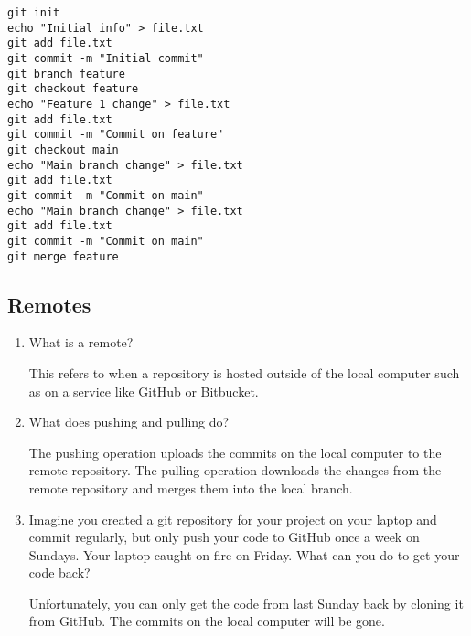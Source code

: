 \documentclass[10pt,twocolumn]{article}
\begin{document}
\begin{enumerate}
\texttt{git init}\\
\texttt{echo "Initial info" > file.txt}\\
\texttt{git add file.txt}\\
\texttt{git commit -m "Initial commit"}\\
\texttt{git branch feature}\\
\texttt{git checkout feature}\\
\texttt{echo "Feature 1 change" > file.txt}\\
\texttt{git add file.txt}\\
\texttt{git commit -m "Commit on feature"}\\
\texttt{git checkout main}\\
\texttt{echo "Main branch change" > file.txt}\\
\texttt{git add file.txt}\\
\texttt{git commit -m "Commit on main"}\\
\texttt{echo "Main branch change" > file.txt}\\
\texttt{git add file.txt}\\
\texttt{git commit -m "Commit on main"}\\
\texttt{git merge feature}\\
\end{enumerate}

\subsection{Remotes}

\begin{enumerate}
\item What is a remote?

This refers to when a repository is hosted outside of the local computer such as on a service like GitHub or Bitbucket. 
\item What does pushing and pulling do?

The pushing operation uploads the commits on the local computer to the remote repository. The pulling operation downloads the changes from the remote repository and merges them into the local branch.
\item Imagine you created a git repository for your project on your laptop and commit regularly, but only push your code to GitHub once a week on Sundays. Your laptop caught on fire on Friday. What can you do to get your code back?

Unfortunately, you can only get the code from last Sunday back by cloning it from GitHub. The commits on the local computer will be gone.
\end{enumerate}
\end{document}
